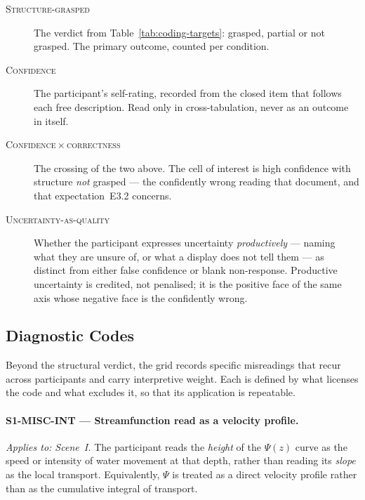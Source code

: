 \begin{description}
\item[\textnormal{\textsc{Structure-grasped}}] The verdict from Table~\ref{tab:coding-targets}: grasped, partial or not grasped. The primary outcome, counted per condition.

\item[\textnormal{\textsc{Confidence}}] The participant's self-rating, recorded from the closed item that follows each free description. Read only in cross-tabulation, never as an outcome in itself.

\item[\textnormal{\textsc{Confidence\,$\times$\,correctness}}] The crossing of the two above. The cell of interest is high confidence with structure \emph{not} grasped --- the confidently wrong reading that \textcite{fischer2020} document, and that expectation~E3.2 concerns.

\item[\textnormal{\textsc{Uncertainty-as-quality}}] Whether the participant expresses uncertainty \emph{productively} --- naming what they are unsure of, or what a display does not tell them --- as distinct from either false confidence or blank non-response. Productive uncertainty is credited, not penalised; it is the positive face of the same axis whose negative face is the confidently wrong.
\end{description}

\subsection{Diagnostic Codes}
\label{subsec:app-diagnostic}

Beyond the structural verdict, the grid records specific misreadings that recur across participants and carry interpretive weight. Each is defined by what licenses the code and what excludes it, so that its application is repeatable.

\paragraph{S1-MISC-INT --- Streamfunction read as a velocity profile.}
\emph{Applies to: Scene~I.} The participant reads the \emph{height} of the $\Psi(z)$ curve as the speed or intensity of water movement at that depth, rather than reading its \emph{slope} as the local transport. Equivalently, $\Psi$ is treated as a direct velocity profile rather than as the cumulative integral of transport.

